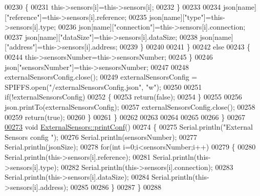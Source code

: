 \begin{DoxyCode}
00230                     \{
00231                         this->sensors[i]=this->sensors[i];                  
00232                     \}
00233                                             
00234                     json[name][\textcolor{stringliteral}{"reference"}]=this->sensors[i].reference;
00235                     json[name][\textcolor{stringliteral}{"type"}]=this->sensors[i].type;
00236                     json[name][\textcolor{stringliteral}{"connection"}]=this->sensors[i].connection;
00237                     json[name][\textcolor{stringliteral}{"dataSize"}]=this->sensors[i].dataSize;
00238                     json[name][\textcolor{stringliteral}{"address"}]=this->sensors[i].address;
00239                 \}
00240  
00241             \}
00242             \textcolor{keywordflow}{else}
00243             \{
00244                 this->sensorsNumber=this->sensorsNumber;
00245             \}
00246             json[\textcolor{stringliteral}{"sensorsNumber"}]=this->sensorsNumber;
00247 
00248             externalSensorsConfig.close();
00249             externalSensorsConfig = SPIFFS.open(\textcolor{stringliteral}{"/externalSensorsConfig.json"}, \textcolor{stringliteral}{"w"});
00250 
00251             \textcolor{keywordflow}{if}(!externalSensorsConfig)
00252             \{
00253                 \textcolor{keywordflow}{return}(\textcolor{keyword}{false});
00254             \}
00255             
00256             json.printTo(externalSensorsConfig);
00257             externalSensorsConfig.close();
00258             
00259             \textcolor{keywordflow}{return}(\textcolor{keyword}{true}); 
00260         \}
00261     \}   
00262     
00263 
00264 
00265 
00266 \}
00267 
\hyperlink{class_external_sensors_a78c2bf55084435dd51d3c559b2d3c6f3}{00273} \textcolor{keywordtype}{void} \hyperlink{class_external_sensors_a78c2bf55084435dd51d3c559b2d3c6f3}{ExternalSensors::printConf}()
00274 \{
00275     Serial.println(\textcolor{stringliteral}{"External Sensors config "});
00276     Serial.println(sensorsNumber);
00277     Serial.println(jsonSize);
00278     \textcolor{keywordflow}{for}(\textcolor{keywordtype}{int} i=0;i<sensorsNumber;i++)
00279     \{
00280         Serial.println(this->sensors[i].reference);
00281         Serial.println(this->sensors[i].type);
00282         Serial.println(this->sensors[i].connection);
00283         Serial.println(this->sensors[i].dataSize);
00284         Serial.println(this->sensors[i].address);
00285     
00286     \}
00287 \}
00288 
\end{DoxyCode}
